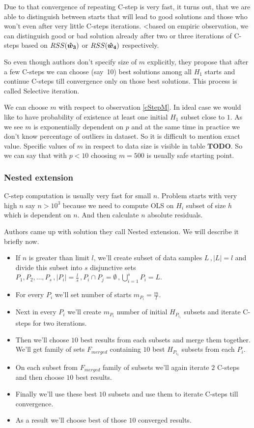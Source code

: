 Due to that convergence of repeating C-step is very fast, it turns out, that we are able to distinguish between starts that will lead to good solutions and those who won't even after very little C-steps iterations. <based on empiric observation, we can distinguish good or bad solution already after two or three iterations of C-steps based on $RSS(\boldsymbol{\hat{w}_3})$ or $RSS(\boldsymbol{\hat{w}_4})$ respectively. 

So even though authors don't specify size of $m$ explicitly, they propose that after a few C-steps we can choose (say~10) best solutions among all $H_1$ starts and continue C-steps till convergence only on those best solutions.
This process is called Selective iteration.

\begin{itshape}
	We can choose $m$ with respect to observation \ref{cStepM}. In ideal case we would like to have probability of existence at least one initial $H_1$ subset close to $1$. As we see $m$ is exponentially dependent on $p$ and at the same time in practice we don't know percentage of outliers in dataset. So it is difficult to mention exact value. Specific values of $m$ in respect to data size is visible in table $\boldsymbol{TODO}$. So we can say that with $p < 10$ choosing $m = 500$ is usually safe starting point.
\end{itshape}

\subsubsection{Nested extension}
C-step computation is usually very fast for small $n$. Problem starts with very high $n$ say $n > 10^3$ because we need to compute OLS on $H_i$ subset of size $h$ which is dependent on $n$. And then calculate $n$ absolute residuals.

Authors came up with solution they call Nested extension. We will describe it briefly now.
\begin{itemize}
	\item If $n$ is greater than limit $l$, we'll create subset of data samples $L\,, |L| = l$ and divide this subset into $s$ disjunctive sets $P_1,P_2,\ldots,P_s\,, |P_i| = \frac{l}{s}\,, P_i\cap P_j  = \emptyset\,, \bigcup_{i=1}^{s} P_{i} = L$.
	\item For every $P_i$ we'll set number of starts $m_{P_i} = \frac{m}{l}$. 
	\item Next in every $P_i$ we'll create $m_{P_i}$ number of initial $H_{P_{i_1}}$ subsets and iterate C-steps for two iterations.
	\item Then we'll choose $10$ best results from each subsets and merge them together. We'll get family of sets
	$F_{merged}$ containing $10$ best $H_{P_{i_3}}$ subsets from each $P_i$.
	\item On each subset from  $F_{merged}$ family of subsets we'll again iterate $2$ C-steps and then choose $10$ best results.
	\item Finally we'll use these best $10$ subsets and use them to iterate C-steps till convergence.
	\item As a result we'll choose best of those $10$ converged results.
\end{itemize} 


